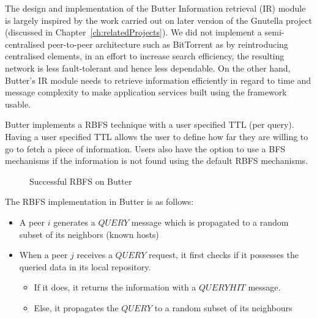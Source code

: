 
The design and implementation of the Butter Information retrieval (IR) module is largely inspired by the work carried out on later version of the Gnutella project (discussed in Chapter~\ref{ch:relatedProjects}). We did not implement a semi-centralised peer-to-peer architecture such as BitTorrent as by reintroducing centralised elements, in an effort to increase search efficiency, the resulting network is less fault-tolerant and hence less dependable. On the other hand, Butter's IR module needs to retrieve information efficiently in regard to time and message complexity to make application services built using the framework usable.

Butter implements a RBFS technique with a user specified TTL (per query). Having a user specified TTL allows the user to define how far they are willing to go to fetch a piece of information. Users also have the option to use a BFS mechanisms if the information is not found using the default RBFS mechanisms.

\begin{figure}[ht]
    \centering
    
    \caption{Successful RBFS on Butter}
    \label{fig:succesfulRBFS}
\end{figure}

\noindent The RBFS implementation in Butter is as follows:
\begin{itemize}
    \item A peer $i$ generates a $QUERY$ message which is propagated to a random subset of its neighbors (known hosts)
    \item When a peer $j$ receives a $QUERY$ request, it first checks if it possesses the queried data in its local repository.
    \begin{itemize}
        \item If it does, it returns the information with a $QUERYHIT$ message.
        \item Else, it propagates the $QUERY$ to a random subset of its neighbours
    \end{itemize}
\end{itemize}

